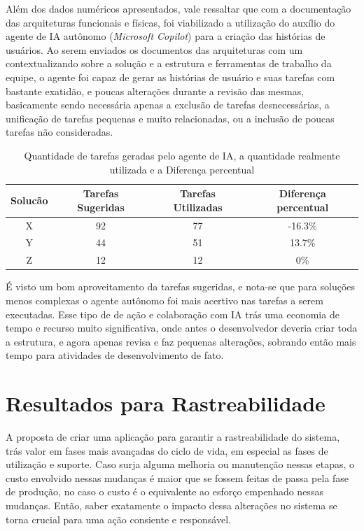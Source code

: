 	Além dos dados numéricos apresentados, vale ressaltar que com a documentação das arquiteturas funcionais e físicas, foi viabilizado a utilização do auxílio
	do agente de IA autônomo (\textit{Microsoft Copilot}) para a criação das histórias de usuários. Ao serem enviados os documentos das arquiteturas com um  contextualizando sobre a solução e
	a estrutura e ferramentas de trabalho da equipe, o agente foi capaz de gerar as histórias de usuário e suas tarefas com bastante exatidão, e poucas alterações durante a
	revisão das mesmas, basicamente sendo necessária apenas a exclusão de tarefas desnecessárias, a unificação de tarefas pequenas e muito relacionadas, ou a inclusão de poucas tarefas não consideradas.

	\begin{table}[!htb]
		\centering
		\begin{tabular}{cccc}
			\toprule
			\textbf{Solucão} & \textbf{Tarefas Sugeridas} & \textbf{Tarefas Utilizadas} & \textbf{Diferença percentual} \\
			\midrule
			X & 92  & 77 & -16.3\% \\
			Y & 44  & 51 & 13.7\% \\
			Z & 12  & 12 & 0\% \\
			\bottomrule
		\end{tabular}
		\caption{Quantidade de tarefas geradas pelo agente de IA, a quantidade realmente utilizada e a Diferença percentual}
		\label{tab:tarefas_copilot}
	\end{table}
	
	É visto um bom aproveitamento da tarefas sugeridas, e nota-se que para soluções menos complexas o agente autônomo foi mais acertivo nas tarefas a serem executadas. Esse tipo de
	de ação e colaboração com IA trás uma economia de tempo e recurso muito significativa, onde antes o desenvolvedor deveria criar toda a estrutura, e agora apenas revisa e faz pequenas alterações,
	sobrando então mais tempo para atividades de desenvolvimento de fato.

	\section{Resultados para Rastreabilidade}

	A proposta de criar uma aplicação para garantir a rastreabilidade do sistema, trás valor em fases mais avançadas do ciclo de vida, em especial as fases de utilização e suporte. Caso surja
	alguma melhoria ou manutenção nessas etapas, o custo envolvido nessas mudanças é maior que se fossem feitas de passa pela fase de produção, no caso o custo é o equivalente ao esforço empenhado nessas
	mudanças. Então, saber exatamente o impacto dessa alterações no sistema se torna crucial para uma ação consiente e responsável.

